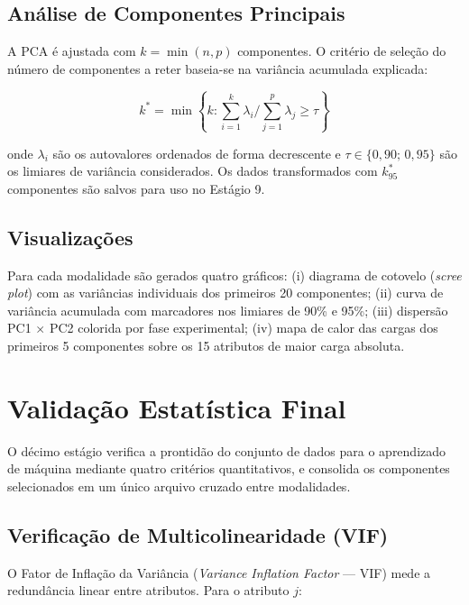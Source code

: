 \subsection{Análise de Componentes Principais}

A PCA é ajustada com $k = \min(n, p)$ componentes. O critério de seleção do número de componentes a reter baseia-se na variância acumulada explicada:

\begin{equation}
    k^* = \min\left\{k : \sum_{i=1}^{k} \lambda_i / \sum_{j=1}^{p} \lambda_j \geq \tau \right\}
    \label{eq:pca_threshold}
\end{equation}

\noindent onde $\lambda_i$ são os autovalores ordenados de forma decrescente e $\tau \in \{0{,}90;\, 0{,}95\}$ são os limiares de variância considerados. Os dados transformados com $k^*_{95}$ componentes são salvos para uso no Estágio 9.

\subsection{Visualizações}

Para cada modalidade são gerados quatro gráficos: (i) diagrama de cotovelo (\textit{scree plot}) com as variâncias individuais dos primeiros 20 componentes; (ii) curva de variância acumulada com marcadores nos limiares de 90\% e 95\%; (iii) dispersão PC1 $\times$ PC2 colorida por fase experimental; (iv) mapa de calor das cargas dos primeiros 5 componentes sobre os 15 atributos de maior carga absoluta.

\section{Validação Estatística Final}
\label{sec:metodo_validacao}

O décimo estágio verifica a prontidão do conjunto de dados para o aprendizado de máquina mediante quatro critérios quantitativos, e consolida os componentes selecionados em um único arquivo cruzado entre modalidades.

\subsection{Verificação de Multicolinearidade (VIF)}

O Fator de Inflação da Variância (\textit{Variance Inflation Factor} --- VIF) mede a redundância linear entre atributos. Para o atributo $j$:


